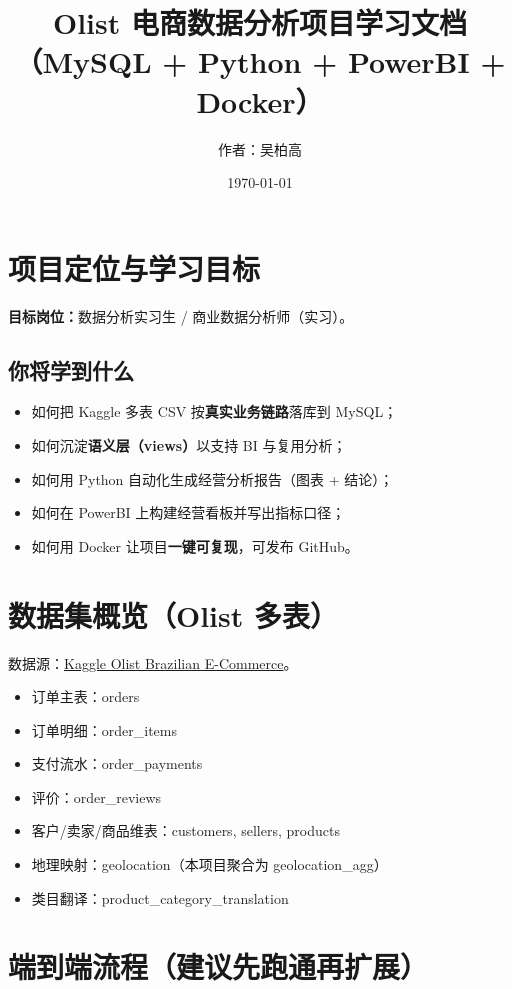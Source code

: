 \documentclass[UTF8,11pt]{ctexart}
\title{Olist 电商数据分析项目学习文档\\（MySQL + Python + PowerBI + Docker）}
\author{作者：吴柏高}
\date{\today}
\begin{document}
\maketitle

\section{项目定位与学习目标}
\textbf{目标岗位：}数据分析实习生 / 商业数据分析师（实习）。

\subsection*{你将学到什么}
\begin{itemize}
  \item 如何把 Kaggle 多表 CSV 按\textbf{真实业务链路}落库到 MySQL；
  \item 如何沉淀\textbf{语义层（views）}以支持 BI 与复用分析；
  \item 如何用 Python 自动化生成经营分析报告（图表 + 结论）；
  \item 如何在 PowerBI 上构建经营看板并写出指标口径；
  \item 如何用 Docker 让项目\textbf{一键可复现}，可发布 GitHub。
\end{itemize}

\section{数据集概览（Olist 多表）}
数据源：\href{https://www.kaggle.com/datasets/olistbr/brazilian-ecommerce/data}{Kaggle Olist Brazilian E-Commerce}。

\begin{itemize}
  \item 订单主表：orders
  \item 订单明细：order\_items
  \item 支付流水：order\_payments
  \item 评价：order\_reviews
  \item 客户/卖家/商品维表：customers, sellers, products
  \item 地理映射：geolocation（本项目聚合为 geolocation\_agg）
  \item 类目翻译：product\_category\_translation
\end{itemize}

\section{端到端流程（建议先跑通再扩展）}
\end{document}
